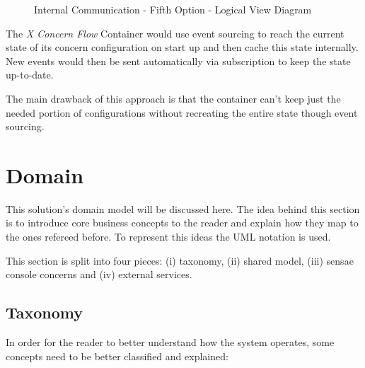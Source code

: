 \begin{figure}[H]
   \centering
   \resizebox{\columnwidth}{!}
   {
      
   }
   \caption[Internal Communication - Fifth Option - Logical View Diagram]{Internal Communication - Fifth Option - Logical View Diagram}
   \label{fig:design:alternatives:internal:fifth:diagram}
\end{figure}

The \textit{X Concern Flow} Container would use event sourcing to reach the current state of its concern configuration on start up and then cache this state internally. New events would then be sent automatically via subscription to keep the state up-to-date.

The main drawback of this approach is that the container can't keep just the needed portion of configurations without recreating the entire state though event sourcing.


\section{Domain}
\label{sec:design:domain}

This solution's domain model will be discussed here. The idea behind this section is to introduce core business concepts to the reader and explain how they map to the ones refereed before. To represent this ideas the \gls{UML} notation is used.

This section is split into four pieces: (i) taxonomy, (ii) shared model, (iii) sensae console concerns and (iv) external services.

\subsection{Taxonomy}
\label{subsec:design:domain:taxonomy}

In order for the reader to better understand how the system operates, some concepts need to be better classified and explained:

